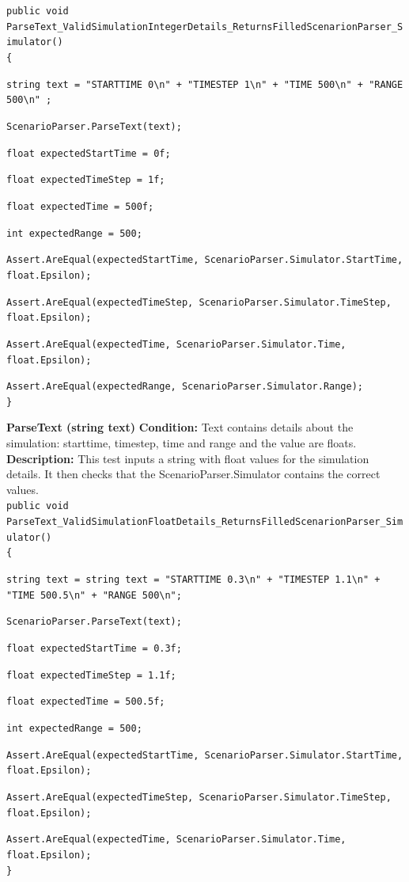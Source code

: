 \documentclass[12pt]{article}
\begin{document}
\texttt{public void ParseText\_ValidSimulationIntegerDetails\_ReturnsFilledScenarionParser\_Simulator()}\\
\texttt{\{}\par
\texttt{string text = "STARTTIME 0\textbackslash n" + "TIMESTEP 1\textbackslash n" + "TIME 500\textbackslash n" + "RANGE 500\textbackslash n" ;
}\par
\texttt{ScenarioParser.ParseText(text);}\par
\texttt{float expectedStartTime = 0f;}\par     
\texttt{float expectedTimeStep = 1f;}\par
\texttt{float expectedTime = 500f;}\par
\texttt{int expectedRange = 500;}\par
\texttt{Assert.AreEqual(expectedStartTime, ScenarioParser.Simulator.StartTime, float.Epsilon);}\par
\texttt{Assert.AreEqual(expectedTimeStep, ScenarioParser.Simulator.TimeStep, float.Epsilon);}\par
\texttt{Assert.AreEqual(expectedTime, ScenarioParser.Simulator.Time, float.Epsilon);}\par
\texttt{Assert.AreEqual(expectedRange, ScenarioParser.Simulator.Range);}\\
\texttt{\}}

\clearpage

{\bfseries ParseText (string text)} \newline
{\bfseries Condition:} Text contains details about the simulation: starttime, timestep, time and range and the value are floats.\newline
{\bfseries Description:} This test inputs a string with float values for the simulation details. It then checks that the ScenarioParser.Simulator contains the correct values.\\

\texttt{public void ParseText\_ValidSimulationFloatDetails\_ReturnsFilledScenarionParser\_Simulator()}\\
\texttt{\{}\par
\texttt{string text = string text = "STARTTIME 0.3\textbackslash n" + "TIMESTEP 1.1\textbackslash n" + "TIME 500.5\textbackslash n" + "RANGE 500\textbackslash n";}\par
\texttt{ScenarioParser.ParseText(text);}\par
\texttt{float expectedStartTime = 0.3f;}\par     
\texttt{float expectedTimeStep = 1.1f;}\par
\texttt{float expectedTime = 500.5f;}\par
\texttt{int expectedRange = 500;}\par
\texttt{Assert.AreEqual(expectedStartTime, ScenarioParser.Simulator.StartTime, float.Epsilon);}\par
\texttt{Assert.AreEqual(expectedTimeStep, ScenarioParser.Simulator.TimeStep, float.Epsilon);}\par
\texttt{Assert.AreEqual(expectedTime, ScenarioParser.Simulator.Time, float.Epsilon);}\\
\texttt{\}}
\end{document}
